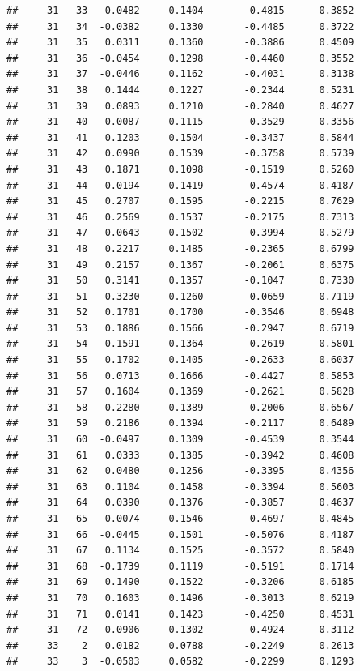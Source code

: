 \documentclass[
]{article}
\begin{document}
\begin{verbatim}
##     31   33  -0.0482     0.1404       -0.4815      0.3852  
##     31   34  -0.0382     0.1330       -0.4485      0.3722  
##     31   35   0.0311     0.1360       -0.3886      0.4509  
##     31   36  -0.0454     0.1298       -0.4460      0.3552  
##     31   37  -0.0446     0.1162       -0.4031      0.3138  
##     31   38   0.1444     0.1227       -0.2344      0.5231  
##     31   39   0.0893     0.1210       -0.2840      0.4627  
##     31   40  -0.0087     0.1115       -0.3529      0.3356  
##     31   41   0.1203     0.1504       -0.3437      0.5844  
##     31   42   0.0990     0.1539       -0.3758      0.5739  
##     31   43   0.1871     0.1098       -0.1519      0.5260  
##     31   44  -0.0194     0.1419       -0.4574      0.4187  
##     31   45   0.2707     0.1595       -0.2215      0.7629  
##     31   46   0.2569     0.1537       -0.2175      0.7313  
##     31   47   0.0643     0.1502       -0.3994      0.5279  
##     31   48   0.2217     0.1485       -0.2365      0.6799  
##     31   49   0.2157     0.1367       -0.2061      0.6375  
##     31   50   0.3141     0.1357       -0.1047      0.7330  
##     31   51   0.3230     0.1260       -0.0659      0.7119  
##     31   52   0.1701     0.1700       -0.3546      0.6948  
##     31   53   0.1886     0.1566       -0.2947      0.6719  
##     31   54   0.1591     0.1364       -0.2619      0.5801  
##     31   55   0.1702     0.1405       -0.2633      0.6037  
##     31   56   0.0713     0.1666       -0.4427      0.5853  
##     31   57   0.1604     0.1369       -0.2621      0.5828  
##     31   58   0.2280     0.1389       -0.2006      0.6567  
##     31   59   0.2186     0.1394       -0.2117      0.6489  
##     31   60  -0.0497     0.1309       -0.4539      0.3544  
##     31   61   0.0333     0.1385       -0.3942      0.4608  
##     31   62   0.0480     0.1256       -0.3395      0.4356  
##     31   63   0.1104     0.1458       -0.3394      0.5603  
##     31   64   0.0390     0.1376       -0.3857      0.4637  
##     31   65   0.0074     0.1546       -0.4697      0.4845  
##     31   66  -0.0445     0.1501       -0.5076      0.4187  
##     31   67   0.1134     0.1525       -0.3572      0.5840  
##     31   68  -0.1739     0.1119       -0.5191      0.1714  
##     31   69   0.1490     0.1522       -0.3206      0.6185  
##     31   70   0.1603     0.1496       -0.3013      0.6219  
##     31   71   0.0141     0.1423       -0.4250      0.4531  
##     31   72  -0.0906     0.1302       -0.4924      0.3112  
##     33    2   0.0182     0.0788       -0.2249      0.2613  
##     33    3  -0.0503     0.0582       -0.2299      0.1293  

\end{verbatim}
\end{document}
